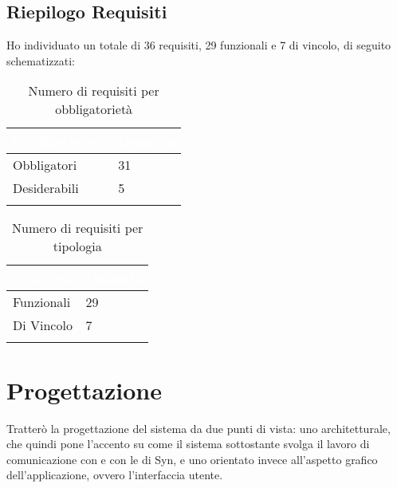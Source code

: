 \subsection{Riepilogo Requisiti}
Ho individuato un totale di 36 requisiti, 29 funzionali e 7 di vincolo, di seguito schematizzati:
{
    \setlength{\freewidth}{\dimexpr\textwidth-10\tabcolsep}
    \renewcommand{\arraystretch}{1.5}
    \centering
    \setlength{\aboverulesep}{0pt}
    \setlength{\belowrulesep}{0pt}
    \begin{longtable}{C{.25\freewidth} C{.2\freewidth}} 
       \toprule
    \textcolor{white}{\textbf{Obbligatorietà}}&
    \textcolor{white}{\textbf{Quantità}}\\
    \toprule
    \endhead

    Obbligatori & 31\\
    Desiderabili & 5\\
    \bottomrule
    \caption{Numero di requisiti per obbligatorietà}
    \end{longtable}
}

{
    \setlength{\freewidth}{\dimexpr\textwidth-10\tabcolsep}
    \renewcommand{\arraystretch}{1.5}
    \centering
    \setlength{\aboverulesep}{0pt}
    \setlength{\belowrulesep}{0pt}
    \begin{longtable}{C{.25\freewidth} C{.2\freewidth}} 
       \toprule
    \textcolor{white}{\textbf{Tipologia}}&
    \textcolor{white}{\textbf{Quantità}}\\
    \toprule
    \endhead

    Funzionali & 29\\
    Di Vincolo & 7\\
    \bottomrule
    \caption{Numero di requisiti per tipologia}
    \end{longtable}
}



\section{Progettazione}
Tratterò la progettazione del sistema da due punti di vista: uno architetturale, che quindi pone l'accento su come il sistema sottostante svolga il lavoro di comunicazione con \asa{} e con le \api{} di Syn, e uno orientato invece all'aspetto grafico dell'applicazione, ovvero l'interfaccia utente.


